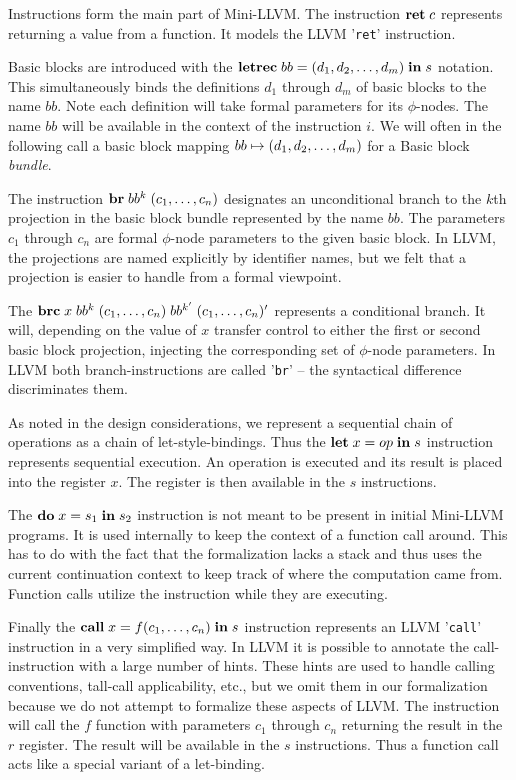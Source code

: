 \documentclass[a4paper, oneside, 10pt, draft]{memoir}
\begin{document}
Instructions form the main part of Mini-LLVM. The instruction
$\mathbf{ret} \; c$ represents returning a value from a function. It models the
LLVM '\texttt{ret}' instruction.

Basic blocks are introduced with the $\mathbf{letrec} \; bb = (d_1, d_2, \dotsc, d_m) \; \mathbf{in} \; s$
notation. This simultaneously binds the definitions $d_1$ through
$d_m$ of basic blocks to the name $bb$. Note each definition will take
formal parameters for its $\phi$-nodes. The name $bb$ will be
available in the context of the instruction $i$. We will often in the
following call a basic block mapping $bb \mapsto (d_1, d_2, \dotsc, d_m)$
for a Basic block \emph{bundle}.

The instruction $\mathbf{br} \; bb^k \; (c_1, \dotsc, c_n)$ designates an
unconditional branch to the $k$th projection in the basic block bundle
represented by the name $bb$. The parameters $c_1$ through $c_n$ are
formal $\phi$-node parameters to the given basic block. In LLVM, the
projections are named explicitly by identifier names, but we felt that
a projection is easier to handle from a formal viewpoint.

The $\mathbf{brc} \; x \; bb^k \; (c_1, \dotsc, c_n) \; bb^{k'} \; (c_1, \dotsc, c_n)'$ represents a conditional
branch. It will, depending on the value of $x$ transfer control to
either the first or second basic block projection, injecting the
corresponding set of $\phi$-node parameters. In LLVM both
branch-instructions are called '\texttt{br}' -- the syntactical
difference discriminates them.

As noted in the design considerations, we represent a sequential chain
of operations as a chain of let-style-bindings. Thus the
$\mathbf{let} \; x = op \; \mathbf{in} \; s$ instruction represents sequential execution. An
operation is executed and its result is placed into the register
$x$. The register is then available in the $s$ instructions.

The $\mathbf{do} \; x = s_1 \; \mathbf{in} \; s_2$ instruction is not meant to be present in
initial Mini-LLVM programs. It is used internally to keep the context
of a function call around. This has to do with the fact that the
formalization lacks a stack and thus uses the current continuation
context to keep track of where the computation came from. Function
calls utilize the instruction while they are executing.

Finally the $\mathbf{call} \; x = f (c_1, \dotsc, c_n)\; \mathbf{in} \; s$ instruction
represents an LLVM '\texttt{call}' instruction in a very simplified
way. In LLVM it is possible to annotate the call-instruction with a
large number of hints. These hints are used to handle calling
conventions, tall-call applicability, etc., but we omit them in our
formalization because we do not attempt to formalize these aspects of
LLVM. The instruction will call the $f$ function with parameters $c_1$
through $c_n$ returning the result in the $r$ register. The result
will be available in the $s$ instructions. Thus a function call acts
like a special variant of a let-binding.
\end{document}
